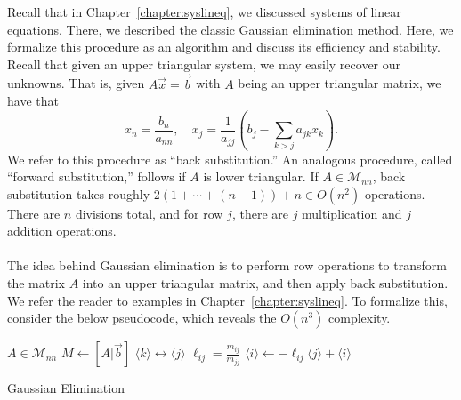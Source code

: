         Recall that in Chapter~\ref{chapter:syslineq}, we discussed systems of linear equations. There, we described the classic Gaussian elimination method. Here, we formalize this procedure as an algorithm and discuss its efficiency and stability. Recall that given an upper triangular system, we may easily recover our unknowns. That is, given \(A\vec{x}=\vec{b}\) with \(A\) being an upper triangular matrix, we have that
        \begin{equation*}
            x_n=\frac{b_n}{a_{nn}},\quad x_j=\frac{1}{a_{jj}}\left(b_j-\sum_{k>j}a_{jk}x_k\right).
        \end{equation*}
        We refer to this procedure as ``back substitution.'' An analogous procedure, called ``forward substitution,'' follows if \(A\) is lower triangular. If \(A\in\mathcal{M}_{nn}\), back substitution takes roughly \(2(1+\cdots+(n-1))+n\in O(n^2)\) operations. There are \(n\) divisions total, and for row \(j\), there are \(j\) multiplication and \(j\) addition operations.
        \\
        \\
        The idea behind Gaussian elimination is to perform row operations to transform the matrix \(A\) into an upper triangular matrix, and then apply back substitution. We refer the reader to examples in Chapter~\ref{chapter:syslineq}. To formalize this, consider the below pseudocode, which reveals the \(O(n^3)\) complexity.
        \begin{algorithm}[H] 
            \begin{algorithmic}[1]
                \Require \(A\in\mathcal{M}_{nn}\) 
                    \State \(M\gets [A|\vec{b}]\)
                         
                        \EndIf
                         \(\langle k\rangle \leftrightarrow \langle j\rangle\)
                        \EndIf
                            \State \(\ell_{ij}=\frac{m_{ij}}{m_{jj}}\)
                            \State \(\langle i\rangle\gets -\ell_{ij}\langle j\rangle+\langle i\rangle\)
                        \EndFor
                    \EndFor
                \EndProcedure 
            \end{algorithmic}
            \caption{Gaussian Elimination}
            \label{alg:gaussianelim}
        \end{algorithm}
